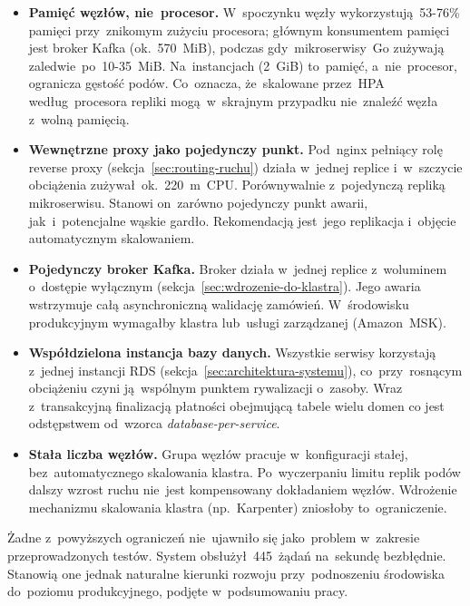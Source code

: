 \begin{itemize}
    \item \textbf{Pamięć węzłów, nie~procesor.} W~spoczynku węzły wykorzystują~53-76\% pamięci przy~znikomym
    zużyciu procesora; głównym konsumentem pamięci jest broker Kafka (ok.~570~MiB), podczas gdy~mikroserwisy~Go
    zużywają zaledwie~po~10-35~MiB. Na~instancjach  (2~GiB) to~pamięć, a~nie~procesor, ogranicza
    gęstość podów. Co~oznacza, że~skalowane przez~HPA według~procesora repliki mogą~w~skrajnym przypadku
    nie~znaleźć węzła z~wolną pamięcią.

    \item \textbf{Wewnętrzne proxy jako pojedynczy punkt.} Pod~nginx pełniący rolę reverse proxy
    (sekcja~\ref{sec:routing-ruchu}) działa w~jednej replice i~w~szczycie obciążenia zużywał~ok.~220~m~CPU.
    Porównywalnie z~pojedynczą repliką mikroserwisu. Stanowi on~zarówno pojedynczy punkt awarii, jak~i~potencjalne
    wąskie gardło. Rekomendacją jest~jego replikacja i~objęcie automatycznym skalowaniem.

    \item \textbf{Pojedynczy broker Kafka.} Broker działa w~jednej replice z~woluminem o~dostępie wyłącznym
    (sekcja~\ref{sec:wdrozenie-do-klastra}). Jego awaria wstrzymuje całą asynchroniczną walidację zamówień.
    W~środowisku produkcyjnym wymagałby klastra lub~usługi zarządzanej (Amazon~MSK).

    \item \textbf{Współdzielona instancja bazy danych.} Wszystkie serwisy korzystają z~jednej instancji RDS
    (sekcja~\ref{sec:architektura-systemu}), co~przy~rosnącym obciążeniu czyni ją~wspólnym punktem rywalizacji
    o~zasoby. Wraz z~transakcyjną finalizacją płatności obejmującą tabele wielu domen co jest odstępstwem
    od~wzorca \emph{database-per-service}.

    \item \textbf{Stała liczba węzłów.} Grupa węzłów pracuje w~konfiguracji stałej, bez~automatycznego skalowania
    klastra. Po~wyczerpaniu limitu replik podów dalszy wzrost ruchu nie~jest kompensowany dokładaniem węzłów.
    Wdrożenie mechanizmu skalowania klastra (np.\ Karpenter) zniosłoby to~ograniczenie.
\end{itemize}

Żadne z~powyższych ograniczeń nie~ujawniło się jako~problem w~zakresie przeprowadzonych testów. System
obsłużył~445~żądań na~sekundę bezbłędnie. Stanowią one jednak naturalne kierunki rozwoju przy~podnoszeniu
środowiska do~poziomu produkcyjnego, podjęte w~podsumowaniu pracy.